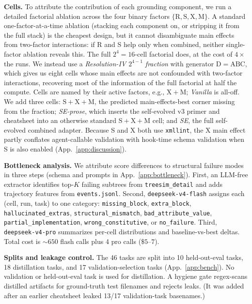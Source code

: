 \documentclass{article}
\begin{document}
\textbf{Cells.} To attribute the contribution of each grounding component, we run a detailed factorial ablation across the four binary factors $\{\mathrm{R, S, X, M}\}$. A standard one-factor-at-a-time ablation (stacking each component on, or stripping it from the full stack) is the cheapest design, but it cannot disambiguate main effects from two-factor interactions: if R and S help only when combined, neither single-factor ablation reveals this. The full $2^4 = 16$-cell factorial does, at the cost of $4{\times}$ the runs. We instead use a \emph{Resolution-IV $2^{4-1}$ fraction} with generator $\mathrm{D}{=}\mathrm{ABC}$, which gives us eight cells whose main effects are not confounded with two-factor interactions, recovering most of the information of the full factorial at half the compute. Cells are named by their active factors, e.g., $\mathrm{X+M}$; \emph{Vanilla} is all-off. We add three cells: $\mathrm{S+X+M}$, the predicted main-effects-best corner missing from the fraction; \emph{SE-prose}, which inserts the self-evolved v3 primer and cheatsheet into an otherwise standard $\mathrm{S+X+M}$ cell; and \emph{SE}, the full self-evolved combined adapter. Because S and X both use \texttt{xmllint}, the X main effect partly conflates agent-callable validation with hook-time schema validation when S is also enabled (App.~\ref{app:discussion}).

\textbf{Bottleneck analysis.} We attribute score differences to structural failure modes in three steps (schema and prompts in App.~\ref{app:bottleneck}). First, an LLM-free extractor identifies top-$K$ failing subtrees from \texttt{treesim\_detail} and adds trajectory features from \texttt{events.jsonl}. Second, \texttt{deepseek-v4-flash} assigns each (cell, run, task) to one category: \texttt{missing\_block}, \texttt{extra\_block}, \texttt{hallucinated\_extras}, \texttt{structural\_mismatch}, \texttt{bad\_attribute\_value}, \texttt{partial\_implementation}, \texttt{wrong\_constitutive}, or \texttt{no\_failure}. Third, \texttt{deepseek-v4-pro} summarizes per-cell distributions and baseline-vs-best deltas. Total cost is ${\sim}650$ flash calls plus 4 pro calls ($\$5\text{--}7$).

\textbf{Splits and leakage control.} The 46 tasks are split into 10 held-out-eval tasks, 18 distillation tasks, and 17 validation-selection tasks (App.~\ref{app:bench}). No validation or held-out-eval task is used for distillation. A hygiene gate regex-scans distilled artifacts for ground-truth test filenames and rejects leaks. (It was added after an earlier cheatsheet leaked 13/17 validation-task basenames.)
\end{document}
